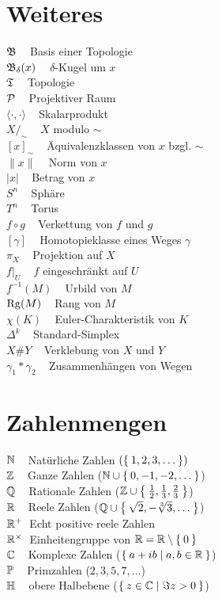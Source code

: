 \section*{Weiteres}
$\mathfrak{B}\;\;\;$ Basis einer Topologie\\
$\mathfrak{B}_\delta(x)\;\;\;$ $\delta$-Kugel um $x$\\
$\mathfrak{T}\;\;\;$ Topologie\\

$\mathcal{P}\;\;\;$ Projektiver Raum\\
$\langle \cdot , \cdot \rangle\;\;\;$ Skalarprodukt\\
$X /_\sim\;\;\;$ $X$ modulo $\sim$\\
$[x]_\sim\;\;\;$ Äquivalenzklassen von $x$ bzgl. $\sim$\\
$\| x \|\;\;\;$ Norm von $x$\\
$| x |\;\;\;$ Betrag von $x$\\

$S^n\;\;\;$ Sphäre\\
$T^n\;\;\;$ Torus\\

$f \circ g\;\;\;$ Verkettung von $f$ und $g$\\
$[\gamma]\;\;\;$ Homotopieklasse eines Weges $\gamma$\\
$\pi_X\;\;\;$ Projektion auf $X$\\
$f|_U\;\;\;$ $f$ eingeschränkt auf $U$\\
$f^{-1}(M)\;\;\;$ Urbild von $M$\\
$\operatorname{Rg}(M)\;\;\;$ Rang von $M$\\
$\chi(K)\;\;\;$ Euler-Charakteristik von $K$\\
$\Delta^k\;\;\;$ Standard-Simplex\\
$X \# Y\;\;\;$ Verklebung von $X$ und $Y$\\
$\gamma_1 * \gamma_2\;\;\;$ Zusammenhängen von Wegen\\
\onecolumn

\section*{Zahlenmengen}
$\mathbb{N}\;\;\;$ Natürliche Zahlen $(\Set{1, 2, 3, \dots})$\\
$\mathbb{Z}\;\;\;$ Ganze Zahlen ($\mathbb{N} \cup \Set{0, -1, -2, \dots}$)\\
$\mathbb{Q}\;\;\;$ Rationale Zahlen ($\mathbb{Z} \cup \Set{\frac{1}{2}, \frac{1}{3}, \frac{2}{3}}$)\\
$\mathbb{R}\;\;\;$ Reele Zahlen ($\mathbb{Q} \cup \Set{\sqrt{2}, -\sqrt[3]{3}, \dots}$)\\
$\mathbb{R}^+\;$ Echt positive reele Zahlen\\
$\mathbb{R}^\times\;$ Einheitengruppe von $\mathbb{R} = \mathbb{R} \setminus \Set{0}$\\
$\mathbb{C}\;\;\;$ Komplexe Zahlen ($\Set{a+ib|a,b \in \ensuremath{\mathbb{R}}}$)\\
$\mathbb{P}\;\;\;$ Primzahlen ($2, 3, 5, 7, \dots$)\\
$\mathbb{H}\;\;\;$ obere Halbebene ($\Set{z \in \ensuremath{\mathbb{C}}| \Im{z} > 0}$)\\

